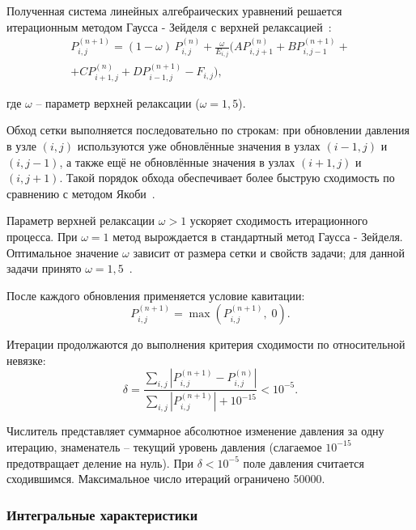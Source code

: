 Полученная система линейных алгебраических уравнений решается итерационным методом Гаусса - Зейделя с верхней релаксацией~\cite{hamrock}:
\begin{equation}
    \begin{split}
    P_{i,j}^{(n+1)} = (1-\omega)\,P_{i,j}^{(n)} + \frac{\omega}{E_{i,j}} \bigl(A P_{i,j+1}^{(n)} + B P_{i,j-1}^{(n+1)} + {} \\
    + C P_{i+1,j}^{(n)} + D P_{i-1,j}^{(n+1)} - F_{i,j}\bigr),
    \end{split}
    \label{eq:sor}
\end{equation}

\noindent где $\omega$ -- параметр верхней релаксации ($\omega = 1{,}5$).

Обход сетки выполняется последовательно по строкам: при обновлении давления в узле $(i, j)$ используются уже обновлённые значения в узлах $(i-1, j)$ и $(i, j-1)$, а также ещё не обновлённые значения в узлах $(i+1, j)$ и $(i, j+1)$. Такой порядок обхода обеспечивает более быструю сходимость по сравнению с методом Якоби~\cite{hamrock}.

Параметр верхней релаксации $\omega > 1$ ускоряет сходимость итерационного процесса. При $\omega = 1$ метод вырождается в стандартный метод Гаусса - Зейделя. Оптимальное значение $\omega$ зависит от размера сетки и свойств задачи; для данной задачи принято $\omega = 1{,}5$~\cite{pinkus}.

После каждого обновления применяется условие кавитации:
\begin{equation}
    P_{i,j}^{(n+1)} = \max(P_{i,j}^{(n+1)},\; 0).
\end{equation}

Итерации продолжаются до выполнения критерия сходимости по относительной невязке:
\begin{equation}
    \delta = \frac{\displaystyle\sum_{i,j} |P_{i,j}^{(n+1)} - P_{i,j}^{(n)}|}{\displaystyle\sum_{i,j} |P_{i,j}^{(n+1)}| + 10^{-15}} < 10^{-5}.
\end{equation}

Числитель представляет суммарное абсолютное изменение давления за одну итерацию, знаменатель -- текущий уровень давления (слагаемое $10^{-15}$ предотвращает деление на нуль). При $\delta < 10^{-5}$ поле давления считается сходившимся. Максимальное число итераций ограничено 50000.

\subsubsection{Интегральные характеристики}

